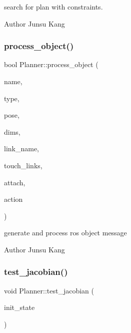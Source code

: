 search for plan with constraints. 

\begin{DoxyAuthor}{Author}
Junsu Kang 
\end{DoxyAuthor}
\mbox{\label{class_r_n_b_1_1_moveit_compact_1_1_planner_adb071291198eec7757985d1f4125e833}} 
\subsubsection{\texorpdfstring{process\+\_\+object()}{process\_object()}}
{\footnotesize\ttfamily bool Planner\+::process\+\_\+object (\begin{DoxyParamCaption}\item[{string}]{name,  }\item[{const Object\+Type}]{type,  }\item[{\hyperlink{class_r_n_b_1_1_moveit_compact_1_1_cart_pose}{Cart\+Pose}}]{pose,  }\item[{Vec3}]{dims,  }\item[{string}]{link\+\_\+name,  }\item[{Name\+List}]{touch\+\_\+links,  }\item[{bool}]{attach,  }\item[{const int}]{action }\end{DoxyParamCaption})}



generate and process ros object message 

\begin{DoxyAuthor}{Author}
Junsu Kang 
\end{DoxyAuthor}
\mbox{\label{class_r_n_b_1_1_moveit_compact_1_1_planner_a859368ee133cab8466f06e46dc1c252a}} 
\subsubsection{\texorpdfstring{test\+\_\+jacobian()}{test\_jacobian()}}
{\footnotesize\ttfamily void Planner\+::test\+\_\+jacobian (\begin{DoxyParamCaption}\item[{Joint\+State}]{init\+\_\+state }\end{DoxyParamCaption})}



